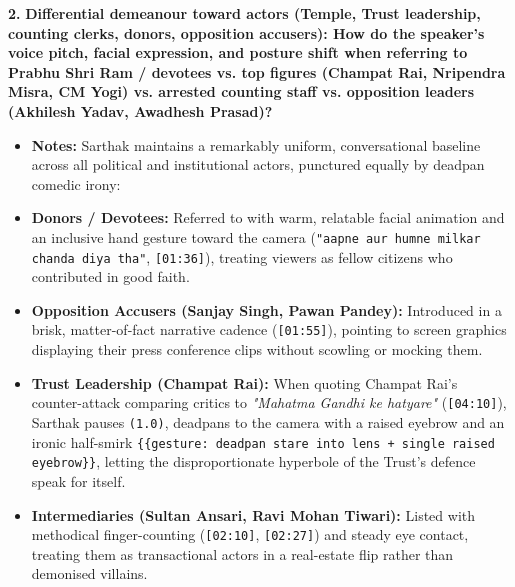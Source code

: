 \documentclass[10pt,a4paper]{article}
\begin{document}
\noindent\textbf{2.} \textbf{Differential demeanour toward actors (Temple, Trust leadership, counting clerks, donors, opposition accusers): How do the speaker's voice pitch, facial expression, and posture shift when referring to Prabhu Shri Ram / devotees vs. top figures (Champat Rai, Nripendra Misra, CM Yogi) vs. arrested counting staff vs. opposition leaders (Akhilesh Yadav, Awadhesh Prasad)?}\par\smallskip
\begin{itemize}
  \item \textbf{Notes:}
Sarthak maintains a remarkably uniform, conversational baseline across all political and institutional actors, punctured equally by deadpan comedic irony:\par\smallskip
  \item \textbf{Donors / Devotees:} Referred to with warm, relatable facial animation and an inclusive hand gesture toward the camera (\texttt{"aapne aur humne milkar chanda diya tha"}, \texttt{[01:36]}), treating viewers as fellow citizens who contributed in good faith.
  \item \textbf{Opposition Accusers (Sanjay Singh, Pawan Pandey):} Introduced in a brisk, matter-of-fact narrative cadence (\texttt{[01:55]}), pointing to screen graphics displaying their press conference clips without scowling or mocking them.
  \item \textbf{Trust Leadership (Champat Rai):} When quoting Champat Rai's counter-attack comparing critics to \textit{"Mahatma Gandhi ke hatyare"} (\texttt{[04:10]}), Sarthak pauses \texttt{(1.0)}, deadpans to the camera with a raised eyebrow and an ironic half-smirk \texttt{\{\{gesture: deadpan stare into lens + single raised eyebrow\}\}}, letting the disproportionate hyperbole of the Trust's defence speak for itself.
  \item \textbf{Intermediaries (Sultan Ansari, Ravi Mohan Tiwari):} Listed with methodical finger-counting (\texttt{[02:10]}, \texttt{[02:27]}) and steady eye contact, treating them as transactional actors in a real-estate flip rather than demonised villains.
\end{itemize}
\end{document}
